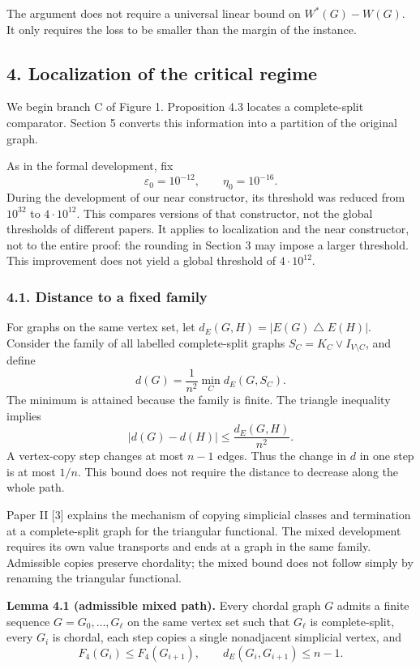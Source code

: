 \documentclass[english,11pt,a4paper]{article}
\begin{document}
The argument does not require a universal linear bound on \(W^*(G)-W(G)\). It only requires the loss to be smaller than the margin of the instance.

\subsection{4. Localization of the critical regime}\label{localization-of-the-critical-regime}

We begin branch C of Figure 1. Proposition 4.3 locates a complete-split comparator. Section 5 converts this information into a partition of the original graph.

As in the formal development, fix \[
\varepsilon_0=10^{-12},\qquad \eta_0=10^{-16}.
\tag{4.1}
\] During the development of our near constructor, its threshold was reduced from \(10^{32}\) to \(4\cdot10^{12}\). This compares versions of that constructor, not the global thresholds of different papers. It applies to localization and the near constructor, not to the entire proof: the rounding in Section 3 may impose a larger threshold. This improvement does not yield a global threshold of \(4\cdot10^{12}\).

\subsubsection{4.1. Distance to a fixed family}\label{distance-to-a-fixed-family}

For graphs on the same vertex set, let \(d_E(G,H)=|E(G)\mathbin{\triangle}E(H)|\). Consider the family of all labelled complete-split graphs \(S_C=K_C\vee I_{V\setminus C}\), and define \[
d(G)=\frac1{n^2}\min_C d_E(G,S_C).
\] The minimum is attained because the family is finite. The triangle inequality implies \[
|d(G)-d(H)|\le\frac{d_E(G,H)}{n^2}.
\tag{4.2}
\] A vertex-copy step changes at most \(n-1\) edges. Thus the change in \(d\) in one step is at most \(1/n\). This bound does not require the distance to decrease along the whole path.

Paper II {[}3{]} explains the mechanism of copying simplicial classes and termination at a complete-split graph for the triangular functional. The mixed development requires its own value transports and ends at a graph in the same family. Admissible copies preserve chordality; the mixed bound does not follow simply by renaming the triangular functional.


\textbf{Lemma 4.1 (admissible mixed path).} Every chordal graph \(G\) admits a finite sequence \(G=G_0,\ldots,G_\ell\) on the same vertex set such that \(G_\ell\) is complete-split, every \(G_i\) is chordal, each step copies a single nonadjacent simplicial vertex, and \[
F_4(G_i)\le F_4(G_{i+1}),\qquad
d_E(G_i,G_{i+1})\le n-1.
\tag{4.3}
\]
\end{document}
